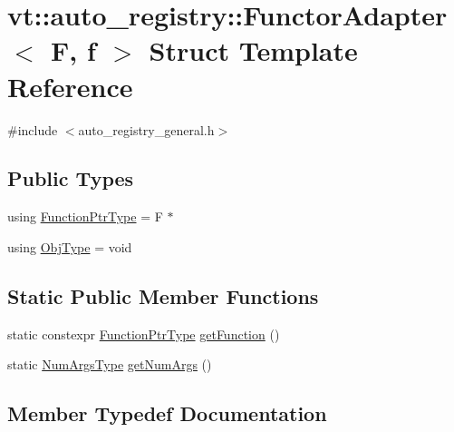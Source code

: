 \hypertarget{structvt_1_1auto__registry_1_1_functor_adapter}{}\section{vt\+:\+:auto\+\_\+registry\+:\+:Functor\+Adapter$<$ F, f $>$ Struct Template Reference}
\label{structvt_1_1auto__registry_1_1_functor_adapter}


{\ttfamily \#include $<$auto\+\_\+registry\+\_\+general.\+h$>$}

\subsection*{Public Types}
\begin{DoxyCompactItemize}
\item 
using \hyperlink{structvt_1_1auto__registry_1_1_functor_adapter_a0bd9bd956e985ea53ad574d96bbcdfa1}{Function\+Ptr\+Type} = F $\ast$
\item 
using \hyperlink{structvt_1_1auto__registry_1_1_functor_adapter_acfe32996589057d89a50c88bc78529ec}{Obj\+Type} = void
\end{DoxyCompactItemize}
\subsection*{Static Public Member Functions}
\begin{DoxyCompactItemize}
\item 
static constexpr \hyperlink{structvt_1_1auto__registry_1_1_functor_adapter_a0bd9bd956e985ea53ad574d96bbcdfa1}{Function\+Ptr\+Type} \hyperlink{structvt_1_1auto__registry_1_1_functor_adapter_af7868cfd0a03bdc74030f75246e3f702}{get\+Function} ()
\item 
static \hyperlink{namespacevt_1_1auto__registry_aebda1d9d765bc9147dc654ad0712c936}{Num\+Args\+Type} \hyperlink{structvt_1_1auto__registry_1_1_functor_adapter_a5f5e6ebbda45d5573e3b2f3da063e81b}{get\+Num\+Args} ()
\end{DoxyCompactItemize}


\subsection{Member Typedef Documentation}
\mbox{\label{structvt_1_1auto__registry_1_1_functor_adapter_a0bd9bd956e985ea53ad574d96bbcdfa1}} 
